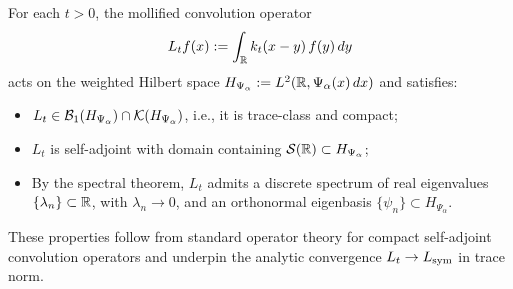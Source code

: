 \begin{remark}
\label{rem:spectrum_Lt_real_discrete}
For each \( t > 0 \), the mollified convolution operator
\[
L_t f(x) := \int_{\mathbb{R}} k_t(x - y)\, f(y)\, dy
\]
acts on the weighted Hilbert space \( H_{\Psi_\alpha} := L^2(\mathbb{R}, \Psi_\alpha(x)\, dx) \) and satisfies:
\begin{itemize}
  \item \( L_t \in \mathcal{B}_1(H_{\Psi_\alpha}) \cap \mathcal{K}(H_{\Psi_\alpha}) \), i.e., it is trace-class and compact;
  \item \( L_t \) is self-adjoint with domain containing \( \mathcal{S}(\mathbb{R}) \subset H_{\Psi_\alpha} \);
  \item By the spectral theorem, \( L_t \) admits a discrete spectrum of real eigenvalues \( \{ \lambda_n \} \subset \mathbb{R} \), with \( \lambda_n \to 0 \), and an orthonormal eigenbasis \( \{ \psi_n \} \subset H_{\Psi_\alpha} \).
\end{itemize}

These properties follow from standard operator theory for compact self-adjoint convolution operators and underpin the analytic convergence \( L_t \to L_{\mathrm{sym}} \) in trace norm.
\end{remark}
